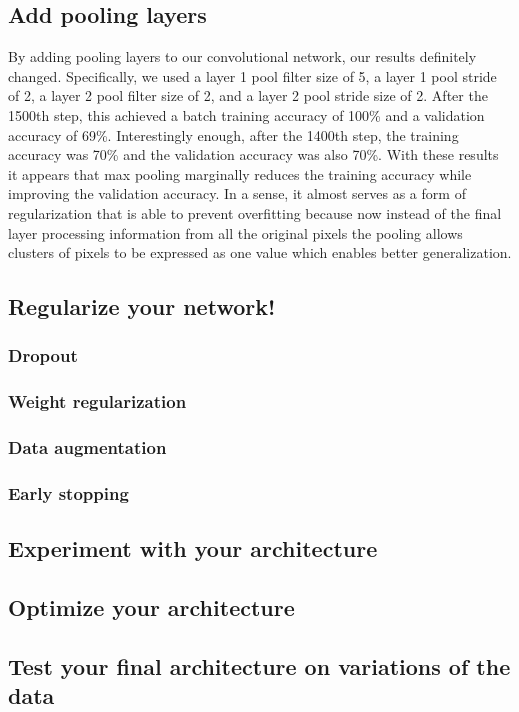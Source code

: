 \documentclass{article}
\begin{document}
\subsection{Add pooling layers}
By adding pooling layers to our convolutional network, our results definitely changed. Specifically, we used a layer 1 pool filter size of 5, a layer 1 pool stride of 2, a layer 2 pool filter size of 2, and a layer 2 pool stride size of 2. After the 1500th step, this achieved a batch training accuracy of 100\% and a validation accuracy of 69\%. Interestingly enough, after the 1400th step, the training accuracy was 70\% and the validation accuracy was also 70\%. With these results it appears that max pooling marginally reduces the training accuracy while improving the validation accuracy. In a sense, it almost serves as a form of regularization that is able to prevent overfitting because now instead of the final layer processing information from all the original pixels the pooling allows clusters of pixels to be expressed as one value which enables better generalization.

\subsection{Regularize your network!}
\subsubsection{Dropout}
\subsubsection{Weight regularization}
\subsubsection{Data augmentation}
\subsubsection{Early stopping}

\subsection{Experiment with your architecture}

\subsection{Optimize your architecture}

\subsection{Test your final architecture on variations of the data}
\end{document}
